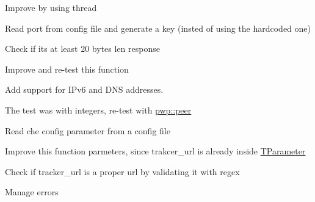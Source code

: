 
\begin{DoxyRefList}
\item[\label{todo__todo000001}%
\Hypertarget{todo__todo000001}%
Member \hyperlink{namespacefileio_a7f1110f96a3deb25d8d75ff0ada7d040}{fileio\+:\+:init\+\_\+bitfield} (Torrent \&torrent)]Improve by using thread 
\item[\label{todo__todo000007}%
\Hypertarget{todo__todo000007}%
Member \hyperlink{namespacet__udp_a5e968355a7c45dae0749b80e1be8308a}{t\+\_\+udp\+:\+:get\+\_\+announce\+\_\+req} (std\+::vector$<$ uint8\+\_\+t $>$ \&req, const \hyperlink{structtracker_1_1TParameter}{tracker\+::\+T\+Parameter} \&param, std\+::vector$<$ uint8\+\_\+t $>$ \&conn\+\_\+id\+\_\+v)]Read port from config file and generate a key (insted of using the hardcoded one) 
\item[\label{todo__todo000008}%
\Hypertarget{todo__todo000008}%
Member \hyperlink{namespacet__udp_a1f2a0ab9801cbc55002e67c166895a0e}{t\+\_\+udp\+:\+:parse\+\_\+announce\+\_\+resp} (std\+::vector$<$ uint8\+\_\+t $>$ \&resp, \hyperlink{namespacepwp_ad07fa6df116b205302ad5ec172277184}{pwp\+::\+Peer\+List} peer\+\_\+list)]Check if it\textquotesingle{}s at least 20 bytes len response 
\item[\label{todo__todo000006}%
\Hypertarget{todo__todo000006}%
Member \hyperlink{namespacetracker_ae542bb4bf17f34b8cadc3a4ae2f5ced2}{tracker\+:\+:is\+\_\+compact\+\_\+response} (const string $\ast$response)]Improve and re-\/test this function 
\item[\label{todo__todo000005}%
\Hypertarget{todo__todo000005}%
Member \hyperlink{namespacetracker_a38d52cf6dd86f2a26a719e285097c805}{tracker\+:\+:parse\+\_\+dict\+\_\+peer} (\hyperlink{structbe__node}{be\+\_\+node} $\ast$node, \hyperlink{namespacepwp_ad07fa6df116b205302ad5ec172277184}{pwp\+::\+Peer\+List} peer\+\_\+list)]Add support for I\+Pv6 and D\+NS addresses. 
\item[\label{todo__todo000003}%
\Hypertarget{todo__todo000003}%
Member \hyperlink{namespacetracker_ab1ce1ce0570dd4742e06b6941f63dbe4}{tracker\+:\+:remove\+\_\+duplicate\+\_\+peers} (\hyperlink{namespacepwp_ad07fa6df116b205302ad5ec172277184}{pwp\+::\+Peer\+List} \&peer\+\_\+list)]The test was with integers, re-\/test with \hyperlink{structpwp_1_1peer}{pwp\+::peer} 
\item[\label{todo__todo000002}%
\Hypertarget{todo__todo000002}%
Member \hyperlink{namespacetracker_afbc30ba2b5f62968e92fedaaa8eab454}{tracker\+:\+:start\+\_\+tracker\+\_\+request} (\hyperlink{structtracker_1_1TParameter}{T\+Parameter} $\ast$param, const T\+List \&tracker\+\_\+list, \hyperlink{namespacepwp_ad07fa6df116b205302ad5ec172277184}{pwp\+::\+Peer\+List} peer\+\_\+list)]Read che config parameter from a config file 
\item[\label{todo__todo000004}%
\Hypertarget{todo__todo000004}%
Member \hyperlink{namespacetracker_a60c22f265981fba0a5dad14d6d3d516a}{tracker\+:\+:url\+\_\+builder} (const string \&tracker\+\_\+url, const \hyperlink{structtracker_1_1TParameter}{T\+Parameter} \&t\+\_\+param, event\+\_\+type event, const string \&tracker\+\_\+key, C\+U\+RL $\ast$curl, bool tls)]Improve this function parmeters, since trakcer\+\_\+url is already inside \hyperlink{structtracker_1_1TParameter}{T\+Parameter} 

Check if tracker\+\_\+url is a proper url by validating it with regex 

Manage errors
\end{DoxyRefList}